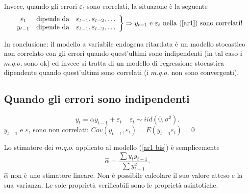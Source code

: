 \documentclass[a4paper]{report}
\theoremstyle{remark}
\begin{document}
\noindent Invece, quando gli errori $\varepsilon _{t}$ sono correlati, la
situazone \`{e} la seguente%
\begin{equation*}
\left. 
\begin{array}{ccc}
\varepsilon _{t} & \text{dipende da} & \varepsilon _{t-1},\varepsilon
_{t-2},\ldots \\ 
y_{t-1} & \text{dipende da} & \varepsilon _{t-1},\varepsilon _{t-2},\ldots%
\end{array}%
\right\} \Rightarrow y_{t-1}\text{ e }\varepsilon _{t}\text{ nella (\ref{ar1}%
) sono correlati!}
\end{equation*}%
\vspace{0.5cm}

\noindent In conclusione: il modello a variabile endogena ritardata \`{e} un
modello stocastico non correlato con gli errori quando quest'ultimi sono
indipendenti (in tal caso i $m.q.o.$ sono ok) ed invece si tratta di un
modello di regressione stocastica dipendente quando quest'ultimi sono
correlati (i $m.q.o.$ non sono convergenti).

\subsection{\label{ver ed errori indipendenti}Quando gli errori sono
indipendenti}

\begin{equation}
y_{t}=\alpha y_{t-1}+\varepsilon _{t}\ \ \ \ \ \varepsilon _{t}\sim
iid(0,\sigma ^{2}).  \label{ar1 bis}
\end{equation}%
$y_{t-1}$ e $\varepsilon _{t}$ sono non correlati: $Cov(y_{t-1},\varepsilon
_{t})=E(y_{t-1}\varepsilon _{t})=0$\vspace{0.5cm}

\noindent Lo stimatore dei $m.q.o.$ applicato al modello (\ref{ar1 bis}) 
\`{e} semplicemente%
\begin{equation*}
\widehat{\alpha }=\frac{\sum y_{t}y_{t-1}}{\sum y_{t-1}^{2}}\text{.}
\end{equation*}%
$\widehat{\alpha }$ non \`{e} uno stimatore lineare. Non \`{e} possibile
calcolare il suo valore atteso e la sua varianza. Le sole propriet\`{a}
verificabili sono le propriet\`{a} asintotiche.
\end{document}
